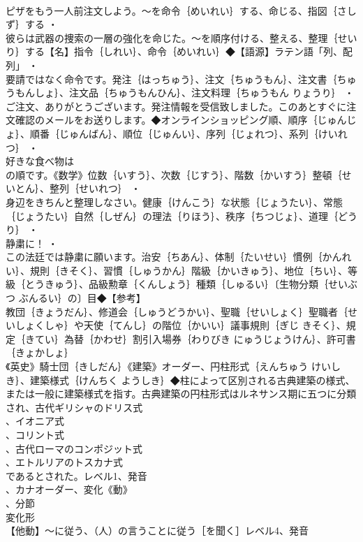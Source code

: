 \documentclass[8pt]{extreport}
\begin{document}
\begin{CJK}{UTF8}{min}
\\	ピザをもう一人前注文しよう。～を命令｛めいれい｝する、命じる、指図｛さしず｝する ・
\\	彼らは武器の捜索の一層の強化を命じた。～を順序付ける、整える、整理｛せいり｝する【名】指令｛しれい｝、命令｛めいれい｝◆【語源】ラテン語「列、配列」 ・
\\	要請ではなく命令です。発注｛はっちゅう｝、注文｛ちゅうもん｝、注文書｛ちゅうもんしょ｝、注文品｛ちゅうもんひん｝、注文料理｛ちゅうもん りょうり｝ ・
\\	ご注文、ありがとうございます。発注情報を受信致しました。このあとすぐに注文確認のメールをお送りします。◆オンラインショッピング順、順序｛じゅんじょ｝、順番｛じゅんばん｝、順位｛じゅんい｝、序列｛じょれつ｝、系列｛けいれつ｝ ・
\\	好きな食べ物は
\\	の順です。《数学》位数｛いすう｝、次数｛じすう｝、階数｛かいすう｝整頓｛せいとん｝、整列｛せいれつ｝ ・
\\	身辺をきちんと整理しなさい。健康｛けんこう｝な状態｛じょうたい｝、常態｛じょうたい｝自然｛しぜん｝の理法｛りほう｝、秩序｛ちつじょ｝、道理｛どうり｝ ・
\\	静粛に！ ・
\\	この法廷では静粛に願います。治安｛ちあん｝、体制｛たいせい｝慣例｛かんれい｝、規則｛きそく｝、習慣｛しゅうかん｝階級｛かいきゅう｝、地位｛ちい｝、等級｛とうきゅう｝、品級勲章｛くんしょう｝種類｛しゅるい｝〔生物分類｛せいぶつ ぶんるい｝の〕目◆【参考】
\\	教団｛きょうだん｝、修道会｛しゅうどうかい｝、聖職｛せいしょく｝聖職者｛せいしょくしゃ｝や天使｛てんし｝の階位｛かいい｝議事規則｛ぎじ きそく｝、規定｛きてい｝為替｛かわせ｝割引入場券｛わりびき にゅうじょうけん｝、許可書｛きょかしょ｝
\\	《英史》騎士団｛きしだん｝《建築》オーダー、円柱形式｛えんちゅう けいしき｝、建築様式｛けんちく ようしき｝◆柱によって区別される古典建築の様式、または一般に建築様式を指す。古典建築の円柱形式はルネサンス期に五つに分類され、古代ギリシャのドリス式
\\	、イオニア式
\\	、コリント式
\\	、古代ローマのコンポジット式
\\	、エトルリアのトスカナ式
\\	であるとされた。レベル1、発音
\\	、カナオーダー、変化《動》
\\	、分節
\\	変化形 
\\	【他動】～に従う、（人）の言うことに従う［を聞く］レベル4、発音

\end{CJK}
\end{document}
